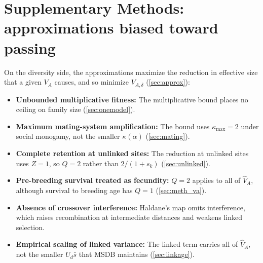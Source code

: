 \documentclass{article}
\begin{document}
    \linenumbers
    \setcounter{figure}{0}
    \renewcommand{\thefigure}{S\arabic{figure}}
\fi

\section*{Supplementary Methods: approximations biased toward passing}
On the diversity side, the approximations maximize the reduction in effective size that a given $V_A$ causes, and so minimize $V_{A,\delta}$ (\autoref{sec:approx}):
\begin{itemize}
    \item \textbf{Unbounded multiplicative fitness:} The multiplicative bound places no ceiling on family size (\autoref{sec:onemodel}).
    \item \textbf{Maximum mating-system amplification:} The bound uses $\kappa_\text{max} = 2$ under social monogamy, not the smaller $\kappa(\alpha)$ (\autoref{sec:mating}).
    \item \textbf{Complete retention at unlinked sites:} The reduction at unlinked sites uses $Z = 1$, so $Q = 2$ rather than $2/(1+s_k)$ (\autoref{sec:unlinked}).
    \item \textbf{Pre-breeding survival treated as fecundity:} $Q = 2$ applies to all of $\hat{V}_A$, although survival to breeding age has $Q = 1$ (\autoref{sec:meth_va}).
    \item \textbf{Absence of crossover interference:} Haldane's map omits interference, which raises recombination at intermediate distances and weakens linked selection.
    \item \textbf{Empirical scaling of linked variance:} The linked term carries all of $\hat{V}_A$, not the smaller $U_d\bar{s}$ that MSDB maintains (\autoref{sec:linkage}).
\end{itemize}
\end{document}
